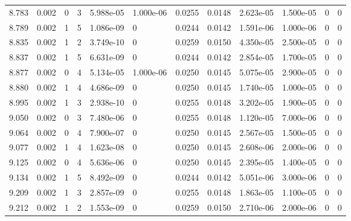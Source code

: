 \documentclass[preview]{standalone}
\begin{document}
{{{{{{\begin{tabular}{L{1.2cm}C{1.2cm} C{0.3cm}C{0.5cm} C{1.4cm}C{1.4cm} C{1.4cm}C{1.4cm} C{1.6cm}C{1.6cm} C{1.6cm}C{1.6cm}}
  8.783  &  0.002  & 0     &  3 &  5.988e-05  & 1.000e-06  &  0.0255&   0.0148& 2.623e-05 & 1.500e-05   &  0 & 0  \\ 
  8.789  &  0.002  & 1     &  5 &  1.086e-09  & 0  &  0.0244&   0.0142& 1.591e-06 & 1.000e-06   &  0 & 0  \\ 
  8.835  &  0.002  & 1     &  2 &  3.749e-10  & 0  &  0.0259&   0.0150& 4.350e-05 & 2.500e-05   &  0 & 0  \\ 
  8.837  &  0.002  & 1     &  5 &  6.631e-09  & 0  &  0.0244&   0.0142& 2.854e-05 & 1.700e-05   &  0 & 0  \\ 
  8.877  &  0.002  & 0     &  4 &  5.134e-05  & 1.000e-06  &  0.0250&   0.0145& 5.075e-05 & 2.900e-05   &  0 & 0  \\ 
  8.880  &  0.002  & 1     &  4 &  4.686e-09  & 0  &  0.0250&   0.0145& 1.740e-05 & 1.000e-05   &  0 & 0  \\ 
  8.995  &  0.002  & 1     &  3 &  2.938e-10  & 0  &  0.0255&   0.0148& 3.202e-05 & 1.900e-05   &  0 & 0  \\ 
  9.050  &  0.002  & 0     &  3 &  7.480e-06  & 0  &  0.0255&   0.0148& 1.120e-05 & 7.000e-06   &  0 & 0  \\ 
  9.064  &  0.002  & 0     &  4 &  7.900e-07  & 0  &  0.0250&   0.0145& 2.567e-05 & 1.500e-05   &  0 & 0  \\ 
  9.077  &  0.002  & 1     &  4 &  1.623e-08  & 0  &  0.0250&   0.0145& 2.608e-06 & 2.000e-06   &  0 & 0  \\ 
  9.125  &  0.002  & 0     &  4 &  5.636e-06  & 0  &  0.0250&   0.0145& 2.395e-05 & 1.400e-05   &  0 & 0  \\ 
  9.134  &  0.002  & 1     &  5 &  8.492e-09  & 0  &  0.0244&   0.0142& 5.051e-06 & 3.000e-06   &  0 & 0  \\ 
  9.209  &  0.002  & 1     &  3 &  2.857e-09  & 0  &  0.0255&   0.0148& 1.863e-05 & 1.100e-05   &  0 & 0  \\ 
  9.212  &  0.002  & 1     &  2 &  1.553e-09  & 0  &  0.0259&   0.0150& 2.710e-06 & 2.000e-06   &  0 & 0  \\ 
\hline 
\end{tabular} 

}}}}}}
\end{document}
